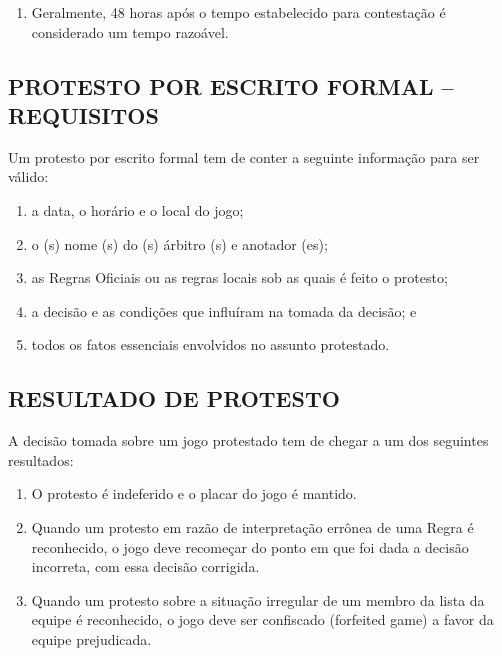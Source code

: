 \begin{multicols}{2}
\begin{enumerate}[label=\alph*)]
	\item  Geralmente, 48 horas após o tempo estabelecido para contesta\c{c}\~ao \'e considerado um tempo razo\'avel. 
\end{enumerate}

\subsection{PROTESTO POR ESCRITO FORMAL -- REQUISITOS}

Um protesto por escrito formal tem de conter a seguinte informa\c{c}\~ao para ser v\'alido: 

\begin{enumerate}[label=\alph*)]
	\item a data, o hor\'ario e o local do jogo; 

	\item  o (s) nome (s) do (s) \'arbitro (s) e anotador (es); 

	\item  as Regras Oficiais ou as regras locais sob as quais \'e feito o protesto; 

	\item  a decis\~ao e as condi\c{c}\~oes que influ\'iram na tomada da decis\~ao; e 

	\item  todos os fatos essenciais envolvidos no assunto protestado. 
\end{enumerate}

\subsection{RESULTADO DE PROTESTO}

A decis\~ao tomada sobre um jogo protestado tem de chegar a um dos seguintes resultados: 

\begin{enumerate}[label=\alph*)]
	\item O protesto \'e indeferido e o placar do jogo \'e mantido. 

	\item  Quando um protesto em raz\~ao de interpreta\c{c}\~ao errônea de uma Regra \'e reconhecido, o jogo deve recome\c{c}ar do ponto em que foi dada a decis\~ao incorreta, com essa decis\~ao corrigida. 

	\item  Quando um protesto sobre a situa\c{c}\~ao irregular de um membro da lista da equipe \'e reconhecido, o jogo deve ser confiscado (\gls{forfeited game}) a favor da equipe prejudicada. 
\end{enumerate}
\end{multicols}



